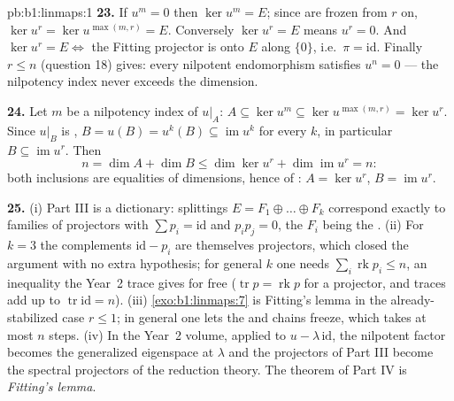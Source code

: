\begin{solution}{pb:b1:linmaps:1}
\textbf{23.} If $u^m = 0$ then $\ker u^m = E$; since  are
frozen from $r$ on, $\ker u^{r} = \ker u^{\max(m, r)} = E$.
Conversely $\ker u^{r} = E$ means $u^{r} = 0$. And $\ker u^{r} =
E \iff$ the Fitting projector is onto $E$ along $\{0\}$, i.e.\
$\pi = \mathrm{id}$. Finally $r \leq n$ (question 18) gives:
every nilpotent endomorphism satisfies $u^{n} = 0$ --- the
nilpotency index never exceeds the dimension.

\textbf{24.} Let $m$ be a nilpotency index of $u|_A$: $A
\subseteq \ker u^{m} \subseteq \ker u^{\max(m,r)} = \ker u^{r}$.
Since $u|_B$ is \omterm{def:b1:logic:inj}{bijective}, $B = u(B) = u^{k}(B) \subseteq
\operatorname{im} u^{k}$ for every $k$, in particular $B
\subseteq \operatorname{im} u^{r}$. Then
\[
n = \dim A + \dim B \leq \dim\ker u^{r} +
\dim\operatorname{im} u^{r} = n :
\]
both inclusions are equalities of dimensions, hence of
: $A = \ker u^{r}$, $B = \operatorname{im} u^{r}$.

\textbf{25.} (i) Part III is a dictionary: splittings $E = F_1
\oplus \dots \oplus F_k$ correspond exactly to families of
projectors with $\sum p_i = \mathrm{id}$ and $p_i p_j = 0$, the
$F_i$ being the . (ii) For $k = 3$ the complements
$\mathrm{id} - p_i$ are themselves projectors, which closed the
argument with no extra hypothesis; for general $k$ one needs
$\sum_i \operatorname{rk} p_i \leq n$, an inequality the Year~2
trace gives for free ($\operatorname{tr} p = \operatorname{rk}
p$ for a projector, and traces add up to $\operatorname{tr}
\mathrm{id} = n$). (iii) \cref{exo:b1:linmaps:7} is Fitting's
lemma in the already-stabilized case $r \leq 1$; in general one
lets the  and  chains freeze, which takes at most $n$
steps. (iv) In the Year~2 volume, applied to $u - \lambda\,
\mathrm{id}$, the nilpotent factor becomes the generalized
eigenspace at $\lambda$ and the projectors of Part III become
the spectral projectors of the reduction theory. The theorem of
Part IV is \emph{Fitting's lemma}.
\end{solution}
